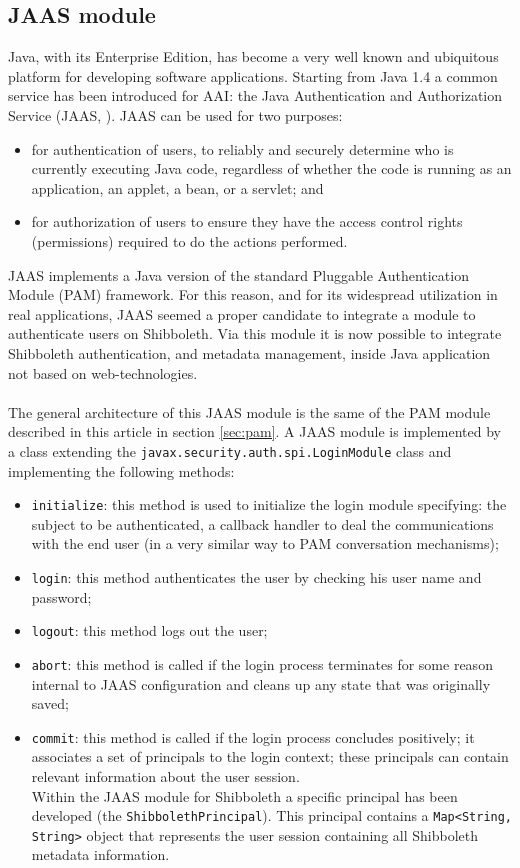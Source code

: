 \label{sec:jaas}
\subsection{JAAS module}
Java, with its Enterprise Edition, has become a very well known and ubiquitous platform for developing software applications.
Starting from Java 1.4 a common service has been introduced for AAI: the Java Authentication and Authorization Service (JAAS,
\cite{Java-2002}).
JAAS can be used for two purposes:
\begin{itemize}
\item for authentication of users, to reliably and securely determine who is currently executing Java code, regardless of
whether the code is running as an application, an applet, a bean, or a servlet; and
\item for authorization of users to ensure they have the access control rights (permissions) required to do the actions
performed.
\end{itemize}

JAAS implements a Java version of the standard Pluggable Authentication Module (PAM) framework.
For this reason, and for its widespread utilization in real applications, JAAS seemed a proper candidate to integrate a module
to authenticate users on Shibboleth.
Via this module it is now possible to integrate Shibboleth authentication, and metadata management, inside Java application
not based on web-technologies.\\
\\
The general architecture of this JAAS module is the same of the PAM module described in this article in section \ref{sec:pam}.
A JAAS module is implemented by a class extending the \texttt{javax.security.auth.spi.LoginModule} class and implementing
the following methods:

\begin{itemize}
\item \texttt{initialize}: this method is used to initialize the login module specifying: the subject to be authenticated,
a callback handler to deal the communications with the end user (in a very similar way to PAM conversation mechanisms);
\item \texttt{login}: this method authenticates the user by checking his user name and password;
\item \texttt{logout}: this method logs out the user;
\item \texttt{abort}: this method is called if the login process terminates for some reason internal to JAAS configuration
and cleans up any state that was originally saved;
\item \texttt{commit}: this method is called if the login process concludes positively; it associates a set of principals
to the login context; these principals can contain relevant information about the user session.\\
Within the JAAS module for Shibboleth a specific principal has been developed (the \texttt{ShibbolethPrincipal}).
This principal contains a \texttt{Map<String, String>} object that represents the user session containing all Shibboleth
metadata information.
\end{itemize}

